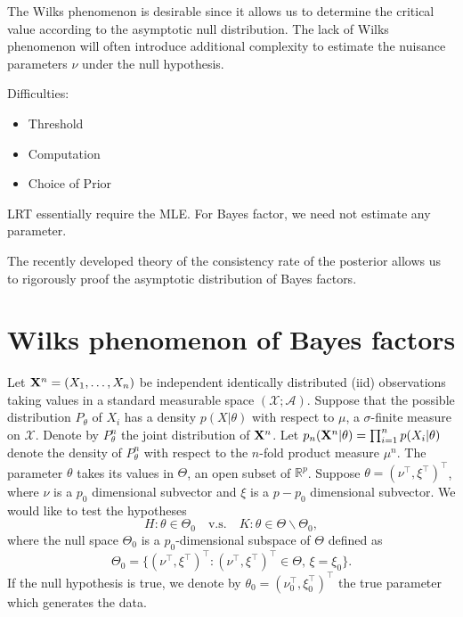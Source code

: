 \documentclass[11pt]{article}
\theoremstyle{plain}
\theoremstyle{definition}
\theoremstyle{remark}
\begin{document}
The Wilks phenomenon is desirable since it allows us to determine the critical value according to the asymptotic null distribution.
The lack of Wilks phenomenon will often introduce additional complexity to estimate the nuisance parameters $\nu$ under the null hypothesis.


Difficulties:
\begin{itemize}
    \item 
        Threshold
    \item
        Computation
    \item
        Choice of Prior
\end{itemize}


LRT essentially require the MLE.
For Bayes factor, we need not estimate any parameter.

The recently developed theory of the consistency rate of the posterior allows us to rigorously proof the asymptotic distribution of Bayes factors.




\section{Wilks phenomenon of Bayes factors}


Let $\mathbf{X}^{n}=(X_1,\ldots,X_n)$ be independent identically distributed (iid) observations taking values in a standard measurable space $(\mathcal{X};\mathscr{A})$.
Suppose that the possible distribution $P_\theta$ of $X_i$ has a density $p(X|\theta)$ with respect to $\mu$, a $\sigma$-finite measure on $\mathcal{X}$.
Denote by $P_{\theta}^{n}$ the joint distribution of $\mathbf{X}^{n}$.
Let $p_{n}(\mathbf{X}^{n}|\theta)=\prod_{i=1}^n p(X_i|\theta)$ denote the density of $P_{\theta}^n$ with respect to the $n$-fold product measure $\mu^n$.
The parameter $\theta$ takes its values in $\Theta$, an open subset of $\mathbb{R}^{p}$.
Suppose $\theta=(\nu^\top ,\xi^\top )^\top $, where $\nu$ is a $p_0$ dimensional subvector and $\xi$ is a $p-p_0$ dimensional subvector.
 We would like to test the hypotheses
\begin{equation*}
    H:\theta\in\Theta_0\quad \text{v.s.}\quad K:\theta\in\Theta\backslash \Theta_0,
\end{equation*}
where the null space $\Theta_0$ is a $p_0$-dimensional subspace of $\Theta$ defined as
\begin{equation*}
    \Theta_0=\{(\nu^\top ,\xi^\top )^\top :(\nu^\top ,\xi^\top )^\top \in\Theta, \, \xi=\xi_0\}.
\end{equation*}
If the null hypothesis is true, we denote by $\theta_0=(\nu_0^\top ,\xi_0^\top )^\top $ the true parameter which generates the data.
\end{document}
